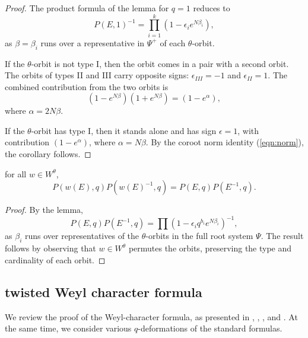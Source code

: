 \begin{proof}  The product formula of the lemma for $q=1$ reduces to
\[
P(E,1)^{-1} = \prod_{i=1}^k (1- \epsilon_i e^{N\beta_i}),
\]
as $\beta=\beta_i$ runs over a representative in $\Psi^+$ of each $\theta$-orbit.

If the $\theta$-orbit is not type I, then the orbit comes in a pair
with a second orbit.  The orbits of types II and III carry opposite signs: $\epsilon_{III}=-1$ and $\epsilon_{II}=1$.
The combined contribution from the
two orbits is
\[
(1- e^{N\beta})(1+e^{N\beta}) = (1-e^{\alpha}),
\]
where $\alpha = 2N\beta$.

If the $\theta$-orbit has type I, then it stands alone and has sign $\epsilon=1$,
with contribution $(1-e^{\alpha})$, where $\alpha = N\beta$.
By the coroot norm identity (\ref{eqn:norm}), the corollary follows.
\end{proof}


\begin{corollary}\label{cor:weyl-p}  
for all $w\in W^\theta$,
\[
P(w(E),q) P(w(E)^{-1},q) = P(E,q)P(E^{-1},q).
\]
\end{corollary}

\begin{proof} 
By the lemma,
\[
P(E,q)P(E^{-1},q) = \prod (1- \epsilon_i q^{b_i} e^{N\beta_i})^{-1},
\]
as $\beta_i$ runs over representatives of the $\theta$-orbits in the full root system $\Psi$.
The result follows by observing  that $w\in W^\theta$ permutes the orbits, preserving the  type
 and cardinality of each orbit.
\end{proof}


\subsection{twisted Weyl character formula}

We review the proof of the Weyl-character formula, as presented in \cite{kostant1961lie}, 
\cite{jantzen1977darstellungen}, \cite{wendt2001weyl}, and \cite{kumar2009characters}.
At the same time, we consider various $q$-deformations of the standard formulas.


